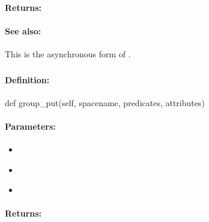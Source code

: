 \paragraph{Returns:}


\paragraph{See also:}  This is the asynchronous form of .

\pagebreak
\subsubsection{}
\label{api:python:group_put}


\paragraph{Definition:}
\begin{pythoncode}
def group_put(self, spacename, predicates, attributes)
\end{pythoncode}

\paragraph{Parameters:}
\begin{itemize}[noitemsep]
\item {}\\

\item {}\\

\item {}\\

\end{itemize}

\paragraph{Returns:}


\pagebreak
\subsubsection{}
\label{api:python:async_group_put}


